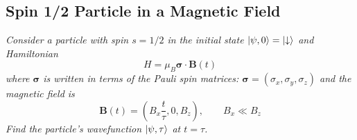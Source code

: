 \documentclass[11pt, a4paper]{article}
\newcommand{\Ham}{Hamiltonian\xspace}
\renewcommand{\vec}[1]{\bm{#1}} %
\newcommand{\p}{\psi}  %
\newcommand{\da}{\downarrow}  %
\begin{document}
\subsection{Spin 1/2 Particle in a Magnetic Field }
\textit{Consider a particle with spin $ s = 1/2 $ in the initial state $ \ket{\p, 0} = \ket{\da} $ and \Ham}
\begin{equation*}
	H = \mu_{B}\vec{\sigma}\cdot \vec{B}(t)
\end{equation*}
\textit{where $ \vec{\sigma} $ is written in terms of the Pauli spin matrices: $ \vec{\sigma} = (\sigma_{x}, \sigma_{y}, \sigma_{z}) $ and the magnetic field is}
\begin{equation*}
	\vec{B}(t) = \left(B_{x} \frac{t}{\tau}, 0, B_{z}\right), \qquad B_{x} \ll B_{z}
\end{equation*}
\textit{Find the particle's wavefunction $ \ket{\p, \tau} $ at $ t = \tau $.}
\end{document}
